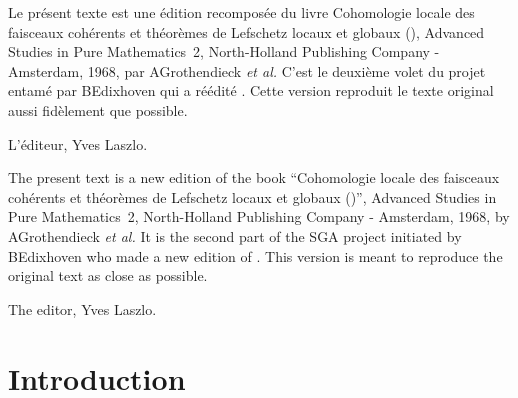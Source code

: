 


\maketitle

\cleardoublepage
\renewcommand{\baselinestretch}{1.1}\normalfont
{}
\thispagestyle{empty}
Le pr\'esent texte est une \'edition recompos\'ee \ignorespaces du livre \og Cohomologie locale des faisceaux coh\'erents et th\'eor\`emes de Lefschetz locaux et globaux ()\fg, Advanced Studies in Pure Mathematics~2, North-Holland Publishing Company - Amsterdam, 1968, par A\ptbl Grothendieck \textit{et al.} C'est le deuxi\`eme volet du projet entam\'e par B\ptbl Edixhoven qui a r\'e\'edit\'e . Cette version reproduit le texte original aussi fid\`element que possible.

\bigskip
\begin{flushright}
L'\'editeur, Yves Laszlo.
\end{flushright}

\vspace*{1cm}

The present text is a new \ignorespaces edition of the book ``Cohomologie locale des faisceaux coh\'erents et th\'eor\`emes de Lefschetz locaux et globaux ()'', Advanced Studies in Pure Mathematics~2, North-Holland Publishing Company - Amsterdam, 1968, by A\ptbl Grothendieck \textit{et al.} It is the second part of the SGA project initiated by B\ptbl Edixhoven who made a new edition of . This version is meant to reproduce the original text as close as possible.

\bigskip
\begin{flushright}
The editor, Yves Laszlo.
\end{flushright}

{\def\ndemark{}\def\sfootnotemark{}\let\\ \relax {}\tableofcontents}

\mainmatter
\chapter*{Introduction} \label{I.0}

